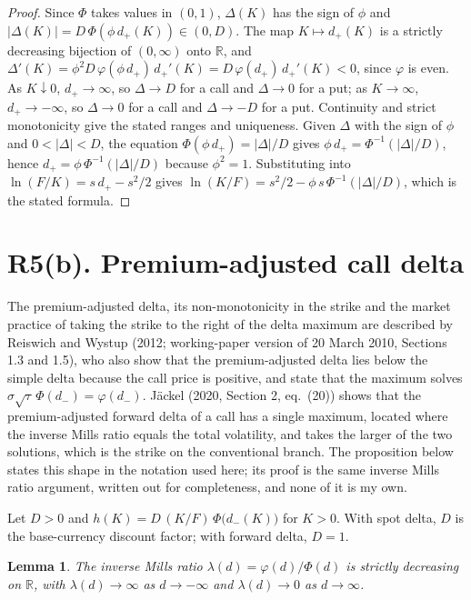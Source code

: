 \documentclass[11pt]{article}
\newtheorem{lemma}[proposition]{Lemma}
\theoremstyle{remark}
\begin{document}
\begin{proof}
Since $\Phi$ takes values in $(0,1)$, $\Delta(K)$ has the sign of $\phi$ and $|\Delta(K)|=D\,\Phi(\phi\,d_+(K))\in(0,D)$. The map $K\mapsto d_+(K)$ is a strictly decreasing bijection of $(0,\infty)$ onto $\mathbb R$, and $\Delta'(K)=\phi^2D\,\varphi(\phi\,d_+)\,d_+'(K)=D\,\varphi(d_+)\,d_+'(K)<0$, since $\varphi$ is even. As $K\downarrow0$, $d_+\to\infty$, so $\Delta\to D$ for a call and $\Delta\to0$ for a put; as $K\to\infty$, $d_+\to-\infty$, so $\Delta\to0$ for a call and $\Delta\to-D$ for a put. Continuity and strict monotonicity give the stated ranges and uniqueness. Given $\Delta$ with the sign of $\phi$ and $0<|\Delta|<D$, the equation $\Phi(\phi\,d_+)=|\Delta|/D$ gives $\phi\,d_+=\Phi^{-1}(|\Delta|/D)$, hence $d_+=\phi\,\Phi^{-1}(|\Delta|/D)$ because $\phi^2=1$. Substituting into $\ln(F/K)=s\,d_+-s^2/2$ gives $\ln(K/F)=s^2/2-\phi\,s\,\Phi^{-1}(|\Delta|/D)$, which is the stated formula.
\end{proof}

\section*{R5(b). Premium-adjusted call delta}

The premium-adjusted delta, its non-monotonicity in the strike and the market practice of taking the strike to the right of the delta maximum are described by Reiswich and Wystup (2012; working-paper version of 20 March 2010, Sections 1.3 and 1.5), who also show that the premium-adjusted delta lies below the simple delta because the call price is positive, and state that the maximum solves $\sigma\sqrt\tau\,\Phi(d_-)=\varphi(d_-)$. J\"ackel (2020, Section 2, eq.~(20)) shows that the premium-adjusted forward delta of a call has a single maximum, located where the inverse Mills ratio equals the total volatility, and takes the larger of the two solutions, which is the strike on the conventional branch. The proposition below states this shape in the notation used here; its proof is the same inverse Mills ratio argument, written out for completeness, and none of it is my own.

Let $D>0$ and $h(K)=D\,(K/F)\,\Phi\bigl(d_-(K)\bigr)$ for $K>0$. With spot delta, $D$ is the base-currency discount factor; with forward delta, $D=1$.

\begin{lemma}
The inverse Mills ratio $\lambda(d)=\varphi(d)/\Phi(d)$ is strictly decreasing on $\mathbb{R}$, with $\lambda(d)\to\infty$ as $d\to-\infty$ and $\lambda(d)\to0$ as $d\to\infty$.
\end{lemma}
\end{document}
